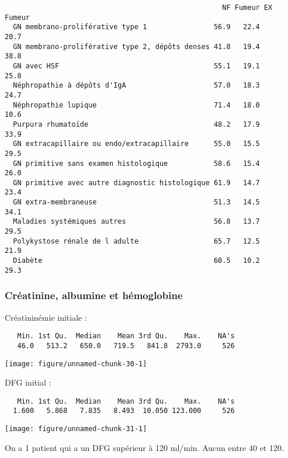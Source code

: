 \documentclass[11pt,a4paper]{article}\usepackage[]{graphicx}\usepackage[]{color}
\makeatletter
\def\maxwidth{ %
  \ifdim\Gin@nat@width>\linewidth
    \linewidth
  \else
    \Gin@nat@width
  \fi
}
\newenvironment{kframe}{%
 \def\at@end@of@kframe{}%
 \ifinner\ifhmode%
  \def\at@end@of@kframe{\end{minipage}}%
  \begin{minipage}{\columnwidth}%
 \fi\fi%
 \def\FrameCommand##1{\hskip\@totalleftmargin \hskip-\fboxsep
 \colorbox{shadecolor}{##1}\hskip-\fboxsep
     \hskip-\linewidth \hskip-\@totalleftmargin \hskip\columnwidth}%
 \MakeFramed {\advance\hsize-\width
   \@totalleftmargin\z@ \linewidth\hsize
   \@setminipage}}%
 {\par\unskip\endMakeFramed%
 \at@end@of@kframe}
\newenvironment{knitrout}{}{} %
\makeatother
\begin{document}
\begin{knitrout}
\begin{kframe}
\begin{verbatim}
                                                    NF Fumeur EX Fumeur
  GN membrano-proliférative type 1                56.9   22.4      20.7
  GN membrano-proliférative type 2, dépôts denses 41.8   19.4      38.8
  GN avec HSF                                     55.1   19.1      25.8
  Néphropathie à dépôts d'IgA                     57.0   18.3      24.7
  Néphropathie lupique                            71.4   18.0      10.6
  Purpura rhumatoïde                              48.2   17.9      33.9
  GN extracapillaire ou endo/extracapillaire      55.0   15.5      29.5
  GN primitive sans examen histologique           58.6   15.4      26.0
  GN primitive avec autre diagnostic histologique 61.9   14.7      23.4
  GN extra-membraneuse                            51.3   14.5      34.1
  Maladies systémiques autres                     56.8   13.7      29.5
  Polykystose rénale de l adulte                  65.7   12.5      21.9
  Diabète                                         60.5   10.2      29.3
\end{verbatim}
\end{kframe}
\end{knitrout}

    \subsubsection{Créatinine, albumine et hémoglobine}

Créatininémie initiale :

\begin{knitrout}
\color{fgcolor}\begin{kframe}
\begin{verbatim}
   Min. 1st Qu.  Median    Mean 3rd Qu.    Max.    NA's 
   46.0   513.2   650.0   719.5   841.8  2793.0     526 
\end{verbatim}
\end{kframe}
\texttt{[image: figure/unnamed-chunk-30-1]} 

\end{knitrout}

DFG initial :


\begin{knitrout}
\color{fgcolor}\begin{kframe}
\begin{verbatim}
   Min. 1st Qu.  Median    Mean 3rd Qu.    Max.    NA's 
  1.600   5.868   7.835   8.493  10.050 123.000     526 
\end{verbatim}
\end{kframe}
\texttt{[image: figure/unnamed-chunk-31-1]} 

\end{knitrout}
On a 1 patient qui a un DFG supérieur à 120 ml/min. Aucun entre 40 et 120.
\end{document}
